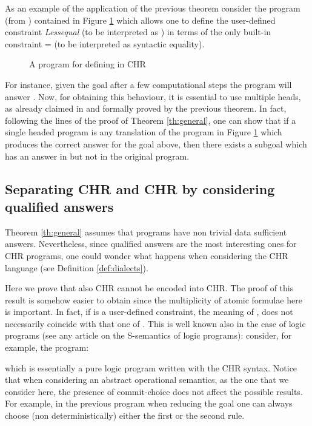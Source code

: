 As an example of the application of the previous theorem consider the program (from  \cite{Fruhwirth98}) contained
in Figure \ref{tab:lessequal} which allows one to define the user-defined constraint \textit{Lessequal} (to be interpreted as  ) in terms of the only  built-in constraint = (to be interpreted as syntactic equality).
\begin{figure}[t]
\begin{center}
\fbox{
\begin{minipage}{12cm}

      \end{minipage}
}
\end{center}
\caption{A program for defining    in CHR}\label{tab:lessequal}
\end{figure}
For instance, given the goal  
 after a few computational steps the program will answer .
 Now, for obtaining this behaviour, it is essential to use multiple heads, as already claimed in \cite{Fruhwirth98} and formally proved by the previous theorem.
In fact, following the lines of the proof of Theorem  \ref{th:general}, one can show that
if a single headed program  is  any translation of the program in Figure \ref{tab:lessequal} which produces the correct answer for the goal above, then there exists a subgoal which has an answer in  but not in the original program.

\subsection{Separating CHR and CHR by considering qualified answers}

Theorem \ref{th:general} assumes that programs have non trivial data sufficient answers. Nevertheless, since qualified answers are the most interesting ones for CHR programs, one could wonder what happens when considering the CHR language (see Definition \ref{def:dialects}).

Here we prove that also CHR  cannot be encoded into CHR.  The proof of this result is somehow easier to obtain since the multiplicity of atomic formulae here is important. In fact,  if  is a user-defined constraint,
the meaning of ,  does not necessarily coincide with that one of . This is well known also in the case of logic programs (see any article on the S-semantics of logic programs): consider, for example, the  program:

which is essentially a pure logic program written with the CHR syntax. Notice that when considering an abstract operational semantics, as the one that we consider here, the presence of commit-choice does not affect the possible results. For example, in the previous program when reducing the goal  one can always choose (non deterministically) either the first or the second rule.



